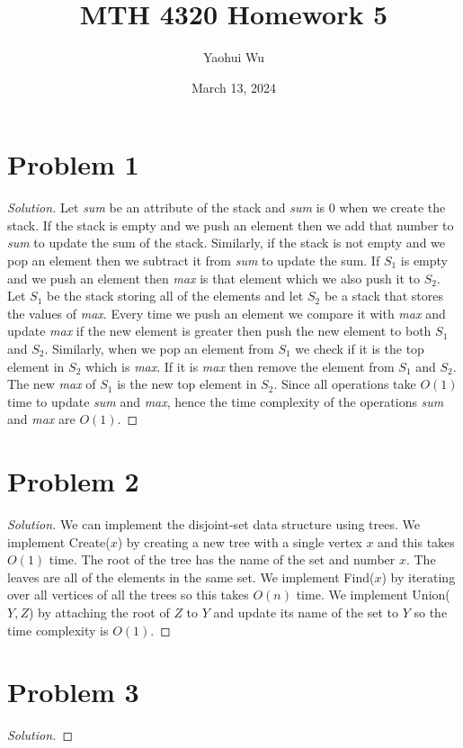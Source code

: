 \documentclass[12pt]{article}
\title{MTH 4320 Homework 5}
\author{Yaohui Wu}
\date{March 13, 2024}
\newenvironment*{solution}{\begin{proof}[Solution]}{\end{proof}}
\begin{document}
\maketitle
\section*{Problem 1}
\begin{solution}
    Let \textit{sum} be an attribute of the stack and \textit{sum} is 0 when
    we create the stack. If the stack is empty and we push an element then we
    add that number to \textit{sum} to update the sum of the stack. Similarly,
    if the stack is not empty and we pop an element then we subtract it from
    \textit{sum} to update the sum. If \(S_1\) is empty and we push an element
    then \textit{max} is that element which we also push it to \(S_2\). Let \(
    S_1\) be the stack storing all of the elements and let \(S_2\) be a stack
    that stores the values of \textit{max}. Every time we push an element we
    compare it with \textit{max} and update \textit{max} if the new element is
    greater then push the new element to both \(S_1\) and \(S_2\). Similarly,
    when we pop an element from \(S_1\) we check if it is the top element in
    \(S_2\) which is \textit{max}. If it is \textit{max} then remove the
    element from \(S_1\) and \(S_2\). The new \textit{max} of \(S_1\) is the
    new top element in \(S_2\). Since all operations take \(O(1)\) time to
    update \textit{sum} and \textit{max}, hence the time complexity of the
    operations \textit{sum} and \textit{max} are \(O(1)\).
\end{solution}
\section*{Problem 2}
\begin{solution}
    We can implement the disjoint-set data structure using trees. We implement
    Create(\(x\)) by creating a new tree with a single vertex \(x\) and this
    takes \(O(1)\) time. The root of the tree has the name of the set and
    number \(x\). The leaves are all of the elements in the same set. We
    implement Find(\(x\)) by iterating over all vertices of all the trees so
    this takes \(O(n)\) time. We implement Union(\(Y, Z\)) by attaching the
    root of \(Z\) to \(Y\) and update its name of the set to \(Y\) so the time
    complexity is \(O(1)\).
\end{solution}
\section*{Problem 3}
\begin{solution}
    
\end{solution}
\end{document}
